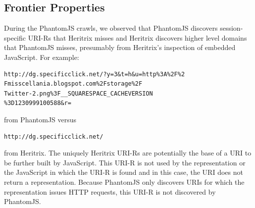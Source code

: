 \documentclass{sig-alternate}
\begin{document}



\subsection{Frontier Properties}
\label{frontierProp}
During the PhantomJS crawls, we observed that PhantomJS discovers session-specific URI-Rs that Heritrix misses and Heritrix discovers higher level domains that PhantomJS misses, presumably from Heritrix's inspection of embedded JavaScript. For example:  
\begin{verbatim}
http://dg.specificclick.net/?y=3&t=h&u=http%3A%2F%2
Fmisscellania.blogspot.com%2Fstorage%2F
Twitter-2.png%3F__SQUARESPACE_CACHEVERSION
%3D1230999100588&r=
\end{verbatim}
\vskip -3mm
\noindent from PhantomJS versus
\begin{verbatim}
http://dg.specificclick.net/
\end{verbatim}
\vskip -3mm

\noindent from Heritrix. The uniquely Heritrix URI-Rs are potentially the base of a URI to be further built by JavaScript. This URI-R is not used by the representation or the JavaScript in which the URI-R is found and in this case, the URI does not return a representation. Because PhantomJS only discovers URIs for which the representation issues HTTP requests, this URI-R is not discovered by PhantomJS.
\end{document}
